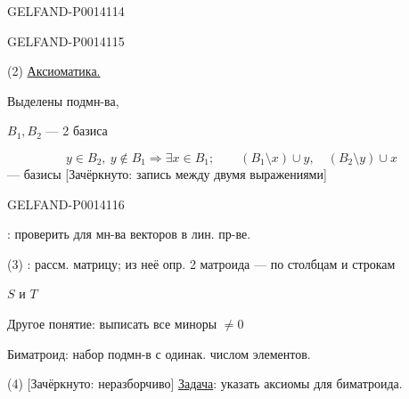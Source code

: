 \begin{GelfandAdjacentEvidence}{GELFAND-P001411}{4}

\end{GelfandAdjacentEvidence}
\begin{GelfandAdjacentEvidence}{GELFAND-P001411}{5}


(2) \uline{Аксиоматика.}

Выделены подмн-ва, 

\(B_1,B_2\) — 2 базиса

\[
y\in B_2,\ y\notin B_1\Rightarrow\exists x\in B_1;\qquad
(B_1\setminus x)\cup y,\quad (B_2\setminus y)\cup x
\]
— базисы [Зачёркнуто: запись между двумя выражениями]
\end{GelfandAdjacentEvidence}
\begin{GelfandAdjacentEvidence}{GELFAND-P001411}{6}


: проверить для мн-ва векторов в лин. пр-ве.

(3) : рассм. матрицу; из неё опр. 2 матроида — по столбцам и строкам

\(S\) и \(T\)

Другое понятие: выписать все миноры \(\ne0\)

Биматроид: набор подмн-в с одинак. числом элементов.

(4) [Зачёркнуто: неразборчиво] \uline{Задача}: указать аксиомы для биматроида.
\end{GelfandAdjacentEvidence}



